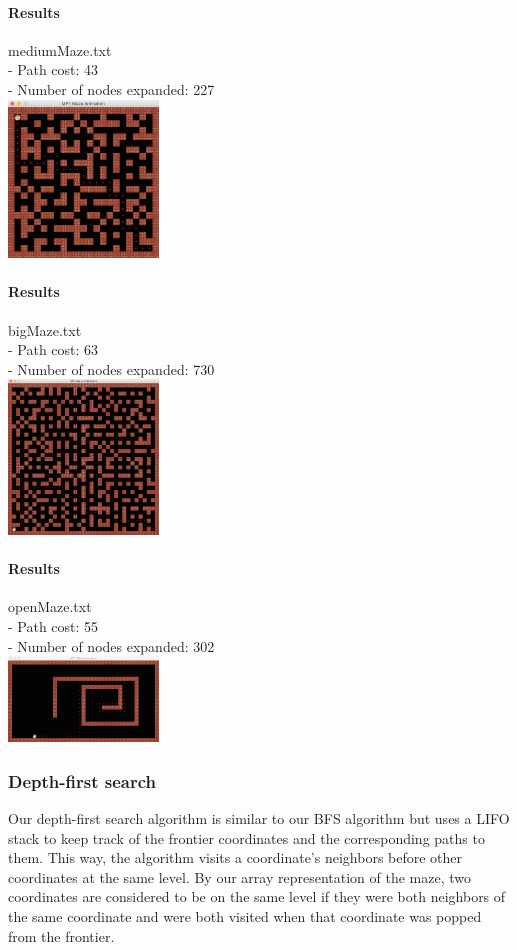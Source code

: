 \begin{multicols*}{2}
\paragraph{Results}
mediumMaze.txt\\
- Path cost: 43\\
- Number of nodes expanded: 227\\
\includegraphics[width=0.3\textwidth]{graphics/mediumMaze_bfs.png}

\columnbreak
\paragraph{Results}
bigMaze.txt\\
- Path cost: 63\\
- Number of nodes expanded: 730\\
\includegraphics[width=0.3\textwidth]{graphics/bigMaze_bfs.png}

\paragraph{Results}
openMaze.txt\\
- Path cost: 55\\
- Number of nodes expanded: 302\\
\includegraphics[width=0.3\textwidth]{graphics/openMaze_bfs.png}

\subsubsection*{Depth-first search}
Our depth-first search algorithm is similar to our BFS algorithm but uses a LIFO stack to keep track of the frontier coordinates and the corresponding paths to them. This way, the algorithm visits a coordinate's neighbors before other coordinates at the same level. By our array representation of the maze, two coordinates are considered to be on the same level if they were both neighbors of the same coordinate and were both visited when that coordinate was popped from the frontier.


\end{multicols*}
